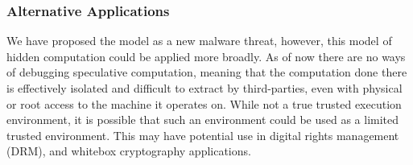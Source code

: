 


\subsubsection{Alternative Applications}
We have proposed the \speculake model as a new malware threat, however, this
model of hidden computation could be applied more broadly. As of now there are no ways of
debugging speculative computation, meaning that the computation done there is
effectively isolated and difficult to extract by third-parties, even with
physical or root access to the machine it operates on. While not a true
trusted execution environment, it is possible that such an environment could be
used as a limited trusted environment. This may have potential use in digital
rights management (DRM), and whitebox cryptography applications.






